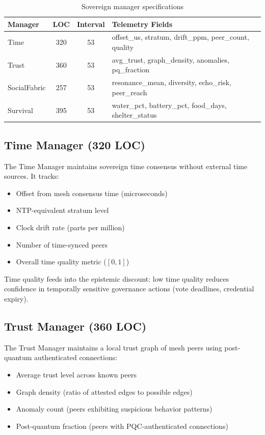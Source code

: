 \documentclass[11pt,twocolumn]{article}
\begin{document}
\begin{table}[H]
\centering
\caption{Sovereign manager specifications}
\label{tab:sovereign}
\scriptsize
\begin{tabular}{@{}lccl@{}}
\toprule
\textbf{Manager} & \textbf{LOC} & \textbf{Interval} & \textbf{Telemetry Fields} \\
\midrule
Time & 320 & 53 & offset\_us, stratum, drift\_ppm, peer\_count, quality \\
Trust & 360 & 53 & avg\_trust, graph\_density, anomalies, pq\_fraction \\
SocialFabric & 257 & 53 & resonance\_mean, diversity, echo\_risk, peer\_reach \\
Survival & 395 & 53 & water\_pct, battery\_pct, food\_days, shelter\_status \\
\bottomrule
\end{tabular}
\end{table}

\subsection{Time Manager (320 LOC)}

The Time Manager maintains sovereign time consensus without external
time sources. It tracks:
\begin{itemize}[nosep]
  \item Offset from mesh consensus time (microseconds)
  \item NTP-equivalent stratum level
  \item Clock drift rate (parts per million)
  \item Number of time-synced peers
  \item Overall time quality metric ($[0, 1]$)
\end{itemize}

Time quality feeds into the epistemic discount: low time quality reduces
confidence in temporally sensitive governance actions (vote deadlines,
credential expiry).

\subsection{Trust Manager (360 LOC)}

The Trust Manager maintains a local trust graph of mesh peers using
post-quantum authenticated connections:

\begin{itemize}[nosep]
  \item Average trust level across known peers
  \item Graph density (ratio of attested edges to possible edges)
  \item Anomaly count (peers exhibiting suspicious behavior patterns)
  \item Post-quantum fraction (peers with PQC-authenticated connections)
\end{itemize}
\end{document}
